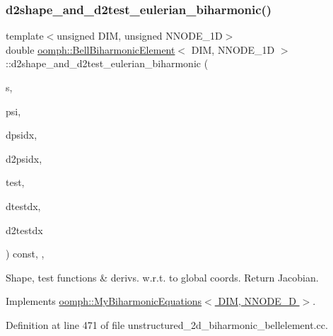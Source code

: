 \subsubsection{\texorpdfstring{d2shape\+\_\+and\+\_\+d2test\+\_\+eulerian\+\_\+biharmonic()}{d2shape\_and\_d2test\_eulerian\_biharmonic()}}
{\footnotesize\ttfamily template$<$unsigned D\+IM, unsigned N\+N\+O\+D\+E\+\_\+1D$>$ \\
double \hyperlink{classoomph_1_1BellBiharmonicElement}{oomph\+::\+Bell\+Biharmonic\+Element}$<$ D\+IM, N\+N\+O\+D\+E\+\_\+1D $>$\+::d2shape\+\_\+and\+\_\+d2test\+\_\+eulerian\+\_\+biharmonic (\begin{DoxyParamCaption}\item[{const Vector$<$ double $>$ \&}]{s,  }\item[{Shape \&}]{psi,  }\item[{D\+Shape \&}]{dpsidx,  }\item[{D\+Shape \&}]{d2psidx,  }\item[{Shape \&}]{test,  }\item[{D\+Shape \&}]{dtestdx,  }\item[{D\+Shape \&}]{d2testdx }\end{DoxyParamCaption}) const\hspace{0.3cm}{\ttfamily [inline]}, {\ttfamily [protected]}, {\ttfamily [virtual]}}



Shape, test functions \& derivs. w.\+r.\+t. to global coords. Return Jacobian. 



Implements \hyperlink{classoomph_1_1MyBiharmonicEquations_a4597b3938b6f1244d6e8e0f58250c14a}{oomph\+::\+My\+Biharmonic\+Equations$<$ D\+I\+M, N\+N\+O\+D\+E\+\_\+D $>$}.



Definition at line 471 of file unstructured\+\_\+2d\+\_\+biharmonic\+\_\+bellelement.\+cc.

\mbox{\label{classoomph_1_1BellBiharmonicElement_ac2875860aa48405076c296341fd778df}} 

